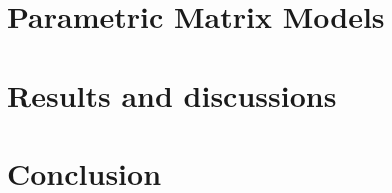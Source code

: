 \documentclass[twocolumn,superscriptaddress,unsortedaddress,nofootinbib,amsmath,amssymb,
aps,floatfix]{revtex4-2}
\begin{document}
\section{Parametric Matrix Models}


\section{Results and discussions}


\section{Conclusion}

%
\end{document}
